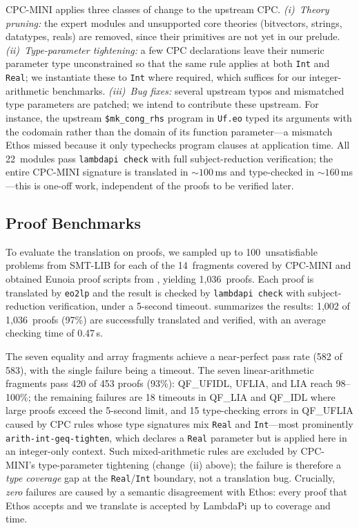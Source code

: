 \documentclass[class=llncs, crop=false]{standalone}
\begin{document}
CPC-MINI applies three classes of change to the
upstream CPC.
\emph{(i)~Theory pruning:} the expert modules and
unsupported core theories (bitvectors, strings,
datatypes, reals) are removed, since their primitives
are not yet in our prelude.
\emph{(ii)~Type-parameter tightening:} a few CPC
declarations leave their numeric parameter type
unconstrained so that the same rule applies at both
\texttt{Int} and \texttt{Real}; we instantiate these
to \texttt{Int} where required, which suffices for
our integer-arithmetic benchmarks.
\emph{(iii)~Bug fixes:} several upstream typos and
mismatched type parameters are patched; we intend to
contribute these upstream. For instance, the
upstream \texttt{\$mk\_cong\_rhs} program in
\texttt{Uf.eo} typed its arguments with the codomain
rather than the domain of its function
parameter---a mismatch Ethos missed because it only
typechecks program clauses at application time.
%
All 22~modules pass
\texttt{lambdapi check} with full subject-reduction
verification; the entire CPC-MINI signature is
translated in ${\sim}100$\,ms and type-checked in
${\sim}160$\,ms---this is one-off work, independent
of the proofs to be verified later.

\subsection{Proof Benchmarks}
%
To evaluate the translation on proofs,
we sampled up to 100~unsatisfiable problems from
SMT-LIB for each of the 14~fragments covered by
CPC-MINI and obtained Eunoia proof scripts from
, yielding 1{,}036~proofs.
%
Each proof is translated by \texttt{eo2lp} and
the result is checked by \texttt{lambdapi check}
with subject-reduction verification,
under a 5-second timeout.
%
 summarizes the results:
1{,}002 of 1{,}036~proofs (97\%) are
successfully translated and verified,
with an average checking time of 0.47\,s.



The seven equality and array fragments achieve a
near-perfect pass rate (582 of 583), with the single
failure being a timeout. The seven linear-arithmetic
fragments pass 420 of 453 proofs (93\%):
QF\_UFIDL, UFLIA, and LIA reach 98--100\%; the
remaining failures are 18 timeouts in QF\_LIA and
QF\_IDL where large proofs exceed the 5-second
limit, and 15 type-checking errors in QF\_UFLIA
caused by CPC rules whose type signatures mix
\texttt{Real} and \texttt{Int}---most prominently
\texttt{arith-int-geq-tighten}, which declares a
\texttt{Real} parameter but is applied here in an
integer-only context.
Such mixed-arithmetic rules are excluded by
CPC-MINI's type-parameter tightening (change~(ii)
above); the failure is therefore a \emph{type
	coverage} gap at the \texttt{Real}/\texttt{Int}
boundary, not a translation bug. Crucially,
\emph{zero} failures are caused by a semantic
disagreement with Ethos: every proof that Ethos
accepts and we translate is accepted by LambdaPi up
to coverage and time.
\end{document}
